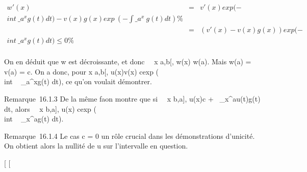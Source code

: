 \documentclass[]{article}
\begin{document}
\begin{align*} w'(x)& =&
v'(x)exp (-\\int ~
\_a^xg(t) dt) - v(x)g(x)exp~
(-\int  \_a^x~g(t) dt)\%&
\\ & =& (v'(x) -
v(x)g(x))exp (-\\int ~
\_a^xg(t) dt) \leq 0 \%& \\
\end{align*}

On en déduit que w est décroissante, et donc
\forall~~x \in {[}a,b{[}, w(x) \leq w(a). Mais w(a) = v(a)
= c. On a donc, pour x \in {[}a,b{[}, \textbar{}u(x)\textbar{}\leq v(x) \leq
cexp (\\int ~
\_a^xg(t) dt), ce qu'on voulait démontrer.

Remarque~16.1.3 De la même fa\ccon on montre que si
\forall~~x \in{]}b,a{]}, \textbar{}u(x)\textbar{}\leq c
+\int ~
\_x^a\textbar{}u(t)\textbar{}g(t) dt, alors
\forall~~x \in{]}b,a{]}, \textbar{}u(x)\textbar{}\leq
cexp (\\int ~
\_x^ag(t) dt).

Remarque~16.1.4 Le cas c = 0 \jmathouera un rôle crucial dans les
démonstrations d'unicité. On obtient alors la nullité de u sur
l'intervalle en question.

{[}
{[}
\end{document}
